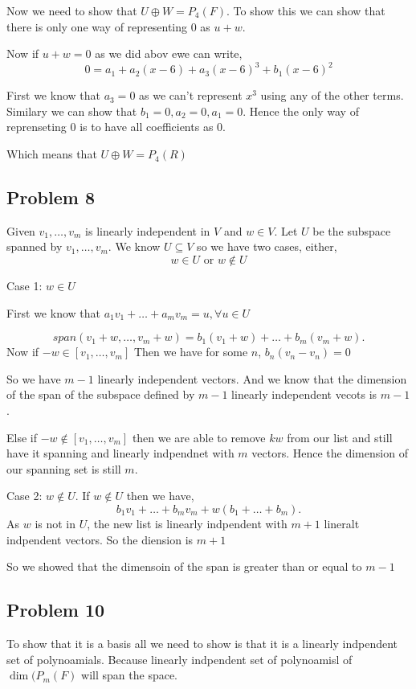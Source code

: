 \documentclass[a4paper]{report}
\begin{document}
Now we need to show that  $ U \oplus W = P_4(F)$. To show this we can show that there is only one way of representing  $0$ as  $u + w$.

Now if  $u + w = 0$ as we did abov ewe can write,  
$$0 = a_1 + a_2(x-6) + a_3(x-6)^3 + b_1(x-6)^2$$

First we know that $a_3 = 0$ as we can't represent $x^3$ using any of the other terms. Similary we can show that $b_1 =0, a_2 = 0, a_1 = 0$. Hence the only way of reprenseting $0$ is to have all coefficients as 0.

Which means that $U \oplus W = P_4(R)$ 

\subsection*{Problem 8}
Given $v_1, \dots, v_m$ is linearly independent in $V$ and $w \in V$. Let $U$ be the subspace spanned by $v_1,\dots, v_m$. We know $U \subseteq V$ so we have two cases, either, $$w \in U \text{ or }  w \not \in U$$

Case 1:  $w \in U$

\qquad First we know that $a_1v_1+ \dots + a_mv_m = u, \forall u \in U$

\[
span(v_1+w, \dots, v_m + w) = b_1(v_1+w) + \dots + b_m(v_m + w)
.\] 
Now if $-w \in [v_1,\dots,v_m]$ Then we have for some $n$,  $b_n(v_n-v_n) = 0$

So we have  $m - 1$ linearly independent vectors. And we know that the dimension of the span of the subspace defined by $m - 1$ linearly independent vecots is $m - 1$.

Else if $-w \not \in [v_1,\dots,v_m]$ then we are able to remove $kw$ from our list and still have it spanning and linearly indpendnet with  $m$ vectors. Hence the dimension of our spanning set is still $m$.

Case 2: $w \not \in U$.
If $w \not \in U$ then we have,  \[
b_1v_1 + \dots + b_mv_m + w(b_1+\dots+b_m)
.\] 
As $w$ is not in $U$, the new list is linearly indpendent with  $m + 1$ lineralt indpendent vectors. So the diension is  $m + 1$

So we showed that the dimensoin of the span is greater than or equal to  $m - 1$



\subsection*{Problem 10}
To show that it is a basis all we need to show is that it is a linearly indpendent set of polynoamials. Because linearly indpendent set of polynoamisl of $\dim(P_m(F)$ will span the space.
\end{document}
